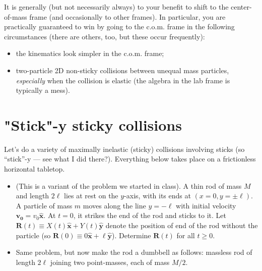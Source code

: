 \documentclass[12pt]{article}
\begin{document}
It is generally (but not necessarily always) to your benefit to shift to the center-of-mass frame (and occasionally to other frames). In particular, you are practically guaranteed to win by going to the c.o.m. frame in the following circumstances (there are others, too, but these occur frequently):
\begin{itemize}
    \item the kinematics look simpler in the c.o.m. frame;
    \item two-particle 2D non-sticky collisions between unequal mass particles, \textit{especially} when the collision is elastic (the algebra in the lab frame is typically a mess).
\end{itemize}

\newpage

\section{"Stick"-y sticky collisions}

Let’s do a variety of maximally inelastic (sticky) collisions involving sticks (so “stick”-y — see what I did there?). Everything below takes place on a frictionless horizontal tabletop.

\begin{itemize}
    \item (This is a variant of the problem we started in class). A thin rod of mass $M$ and length $2\ell$ lies at rest on the $y$-axis, with its ends at $(x = 0, y = \pm\ell)$. A particle of mass $m$ moves along the line $y = -\ell$ with initial velocity $\mathbf{v_0} = v_0\hat{\mathbf{x}}$. At $t = 0$, it strikes the end of the rod and sticks to it. Let $\mathbf{R}(t) \equiv X(t)\hat{\mathbf{x}} + Y(t)\hat{\mathbf{y}}$ denote the position of end of the rod without the particle (so $\mathbf{R}(0) \equiv 0\hat{\mathbf{x}} + \ell\hat{\mathbf{y}}$). Determine $\mathbf{R}(t)$ for all $t \geq 0$.
    
    \item Same problem, but now make the rod a dumbbell as follows: massless rod of length $2\ell$ joining two point-masses, each of mass $M/2$.
\end{itemize}
\end{document}
